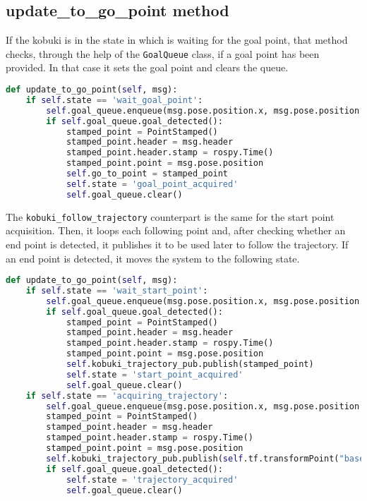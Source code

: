 \subsection*{update\_to\_go\_point method}
If the kobuki is in the state in which is waiting for the goal point, that method checks, through the help of the \texttt{GoalQueue} class, if a goal point has been provided. In that case it sets the goal point and clears the queue.
\begin{lstlisting}[caption={Update To Go Point},label={lst:updatetogopoint},language=Python]
def update_to_go_point(self, msg):
    if self.state == 'wait_goal_point':
        self.goal_queue.enqueue(msg.pose.position.x, msg.pose.position.y)
        if self.goal_queue.goal_detected():
            stamped_point = PointStamped()
            stamped_point.header = msg.header
            stamped_point.header.stamp = rospy.Time()
            stamped_point.point = msg.pose.position
            self.go_to_point = stamped_point
            self.state = 'goal_point_acquired'
            self.goal_queue.clear()
\end{lstlisting}
The \texttt{kobuki\_follow\_trajectory} counterpart is the same for the start point acquisition. Then, it loops each following point and, after checking whether an end point is detected, it publishes it to be used later to follow the trajectory. If an end point is detected, it moves the system to the following state.
\begin{lstlisting}[caption={Update To Go Point},label={lst:updatetogopoint2},language=Python]
def update_to_go_point(self, msg):
    if self.state == 'wait_start_point':
        self.goal_queue.enqueue(msg.pose.position.x, msg.pose.position.y)
        if self.goal_queue.goal_detected():
            stamped_point = PointStamped()
            stamped_point.header = msg.header
            stamped_point.header.stamp = rospy.Time()
            stamped_point.point = msg.pose.position
            self.kobuki_trajectory_pub.publish(stamped_point)
            self.state = 'start_point_acquired'
            self.goal_queue.clear()
    if self.state == 'acquiring_trajectory':
        self.goal_queue.enqueue(msg.pose.position.x, msg.pose.position.y)
        stamped_point = PointStamped()
        stamped_point.header = msg.header
        stamped_point.header.stamp = rospy.Time()
        stamped_point.point = msg.pose.position
        self.kobuki_trajectory_pub.publish(self.tf.transformPoint("base_link", stamped_point))
        if self.goal_queue.goal_detected():
            self.state = 'trajectory_acquired'
            self.goal_queue.clear()
\end{lstlisting}
